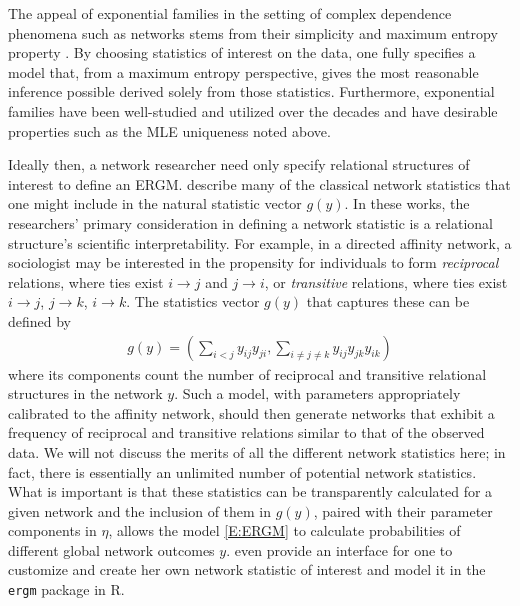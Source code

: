 The appeal of exponential families in the setting of complex dependence phenomena such 
as networks stems from their simplicity and maximum entropy property 
\citep{Jaynes:1978,Geyer:1992}.
By choosing statistics of interest on the data, one fully specifies a model that,
from a maximum entropy perspective, gives the 
most reasonable inference possible  derived solely from those statistics.  
Furthermore, exponential families have been 
well-studied \citep{Barndorff,Brown:1986} and utilized over the decades and have 
desirable properties such as the MLE uniqueness noted above.

Ideally then, a network researcher need only specify relational structures of 
interest to define an ERGM.  
\citet*{Wasserman:1996, Pattison:1999, logit, introp*} describe many of 
the classical network statistics that one might include in the natural statistic vector 
$g(y)$.  In these works, the researchers' primary 
consideration in defining a network statistic is a relational structure's 
scientific interpretability.  
For example, in a directed affinity network, a sociologist may be 
interested in the propensity for individuals to form \emph{reciprocal} relations, where 
ties exist $i \to j$ and $j \to i$, or \emph{transitive} relations, where 
ties exist $i \to j$, $j \to k$, $i \to k$.  The statistics vector $g(y)$ 
that captures these can be defined by
\begin{align*}
	g(y) = \left ( \sum_{i<j} y_{ij}y_{ji}, \sum_{i \neq j \neq k} y_{ij}y_{jk}y_{ik} 
			\right )  
\end{align*}
where its components count the number of reciprocal and transitive relational 
structures in the network $y$.  
Such a model, with parameters appropriately calibrated to the affinity network, 
should then generate networks that exhibit a frequency of reciprocal and 
transitive relations similar to that of the observed data.
We will not discuss the merits of all the different network statistics 
here; in fact, there is essentially an unlimited number of potential network statistics.
What is important is that these statistics can be transparently calculated for a 
given network and the inclusion of them in $g(y)$, paired with their parameter 
components in $\eta$, allows the model \eqref{E:ERGM} to calculate probabilities of 
different global network outcomes $y$.  \citet*{ergm:userterms} 
even provide an interface for one to
customize and create her own network statistic of interest and model it in the 
\texttt{ergm} package in R.

